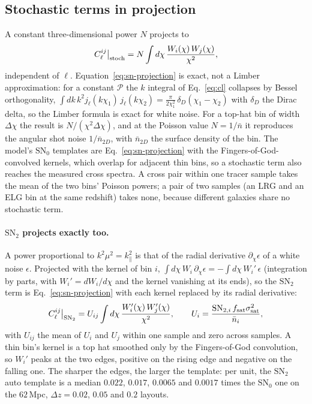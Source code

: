 \documentclass[11pt]{article}
\newcommand{\SNz}{\mathrm{SN}_0}
\newcommand{\SNt}{\mathrm{SN}_2}
\begin{document}
\subsection{Stochastic terms in projection}
\label{sec:stochastic-projection}

A constant three-dimensional power $N$ projects to
\begin{equation}
C_\ell^{ij}\big|_{\rm stoch}
 = N \int d\chi\, \frac{W_i(\chi)\,W_j(\chi)}{\chi^2} ,
\label{eq:sn-projection}
\end{equation}
independent of $\ell$.  Equation~\eqref{eq:sn-projection} is exact,
not a Limber approximation: for a constant $\mathcal{P}$ the $k$
integral of Eq.~\eqref{eq:cl} collapses by Bessel orthogonality,
$\int dk\,k^2 j_\ell(k\chi_1)\,j_\ell(k\chi_2)
 = \tfrac{\pi}{2\chi_1^2}\,\delta_D(\chi_1 - \chi_2)$ with $\delta_D$
the Dirac delta, so
the Limber formula is exact for white noise.  For a top-hat bin of
width $\Delta\chi$ the result is $N/(\chi^2\Delta\chi)$, and at the
Poisson value $N = 1/\bar{n}$ it reproduces the angular shot noise
$1/\bar{n}_{2D}$, with $\bar{n}_{2D}$ the surface density of the bin.
The model's $\SNz$ templates are Eq.~\eqref{eq:sn-projection} with the
Fingers-of-God-convolved kernels, which overlap for adjacent thin bins,
so a stochastic term also reaches the measured cross spectra.  A cross
pair within one tracer sample takes the mean of the two bins' Poisson
powers; a pair of two samples (an LRG and an ELG bin at the same
redshift) takes none, because different galaxies share no stochastic
term.

\paragraph{$\SNt$ projects exactly too.}  A power proportional to
$k^2\mu^2 = k_\parallel^2$ is that of the radial derivative
$\partial_\chi\epsilon$ of a white noise $\epsilon$.  Projected with
the kernel of bin $i$, $\int d\chi\,W_i\,\partial_\chi\epsilon =
-\int d\chi\,W_i'\,\epsilon$ (integration by parts, with
$W_i' = dW_i/d\chi$ and the kernel vanishing at its ends), so the
$\SNt$ term is Eq.~\eqref{eq:sn-projection} with each kernel replaced
by its radial derivative:
\begin{equation}
C_\ell^{ij}\big|_{\SNt} = U_{ij} \int d\chi\,
 \frac{W_i'(\chi)\,W_j'(\chi)}{\chi^2} ,
\qquad U_i = \frac{\mathrm{SN}_{2,i}\,f_{\rm sat}\sigma_{\rm sat}^2}{\bar{n}_i} ,
\label{eq:sn2-projection}
\end{equation}
with $U_{ij}$ the mean of $U_i$ and $U_j$ within one sample and zero
across samples.  A thin bin's kernel is a top hat smoothed only by the
Fingers-of-God convolution, so $W_i'$ peaks at the two edges, positive
on the rising edge and negative on the falling one.  The sharper the
edges, the larger the template: per unit, the $\SNt$ auto template is
a median $0.022$, $0.017$, $0.0065$ and $0.0017$ times the $\SNz$ one
on the $62$\,Mpc, $\Delta z = 0.02$, $0.05$ and $0.2$ layouts.
\end{document}
